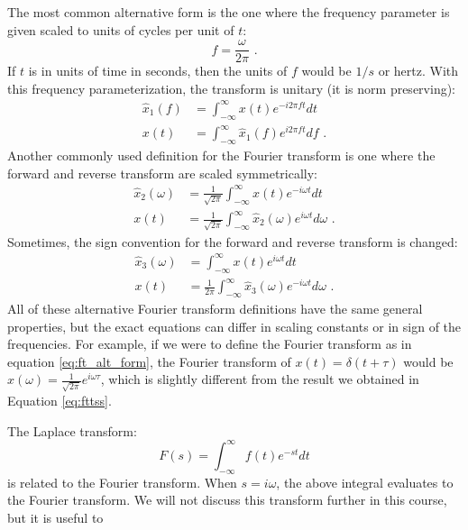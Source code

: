 The most common alternative form is the one where the frequency parameter is given scaled to units of cycles per unit of $t$:
\begin{equation}
f = \frac{\omega}{2\pi}\,\,.
\end{equation}
If $t$ is in units of time in seconds, then the units of $f$ would be $1/s$ or hertz. With this frequency parameterization, the transform is unitary (it is norm preserving):
\begin{align}
\hat{x}_1(f) &=  \int_{-\infty}^{\infty} x(t) e^{-i 2\pi f  t}d t\\
x(t) &= \int_{-\infty}^{\infty} \hat{x}_1(f) e^{i 2\pi f t} d f\,\,.
\end{align}
Another commonly used definition for the Fourier transform is one where the forward and reverse transform are scaled symmetrically:
\begin{align}
\hat{x}_2(\omega) &= \frac{1}{\sqrt{2\pi}} \int_{-\infty}^{\infty} x(t) e^{-i\omega t}dt \label{eq:ft_alt_form}\\
x(t) &= \frac{1}{\sqrt{2\pi}} \int_{-\infty}^{\infty} \hat{x}_2(\omega) e^{i\omega t}d\omega\,\,.
\end{align}
Sometimes, the sign convention for the forward and reverse transform is changed:
\begin{align}
\hat{x}_3(\omega) &=  \int_{-\infty}^{\infty} x(t) e^{i\omega t}dt\\
x(t) &= \frac{1}{2\pi} \int_{-\infty}^{\infty} \hat{x}_3(\omega) e^{-i\omega t}d\omega\,\,.
\end{align}
All of these alternative Fourier transform definitions have the same general properties, but the exact equations can differ in scaling constants or in sign of the frequencies. 
For example, if we were to define the Fourier transform as in equation \ref{eq:ft_alt_form}, the Fourier transform of $x(t)=\delta(t+\tau)$ would be $\hat{x}(\omega)=\frac{1}{\sqrt{2\pi}}e^{i\omega \tau}$, 
which is slightly different from the result we obtained in Equation \ref{eq:fttss}.

The Laplace transform:
\begin{equation}
  F(s) = \int_{-\infty}^{\infty} f(t) e^{-st} dt
\end{equation}
is related to the Fourier transform. When $s=i\omega$, the above integral evaluates to the Fourier transform. We will not discuss this transform further in this course, but it is useful to 
\fi
